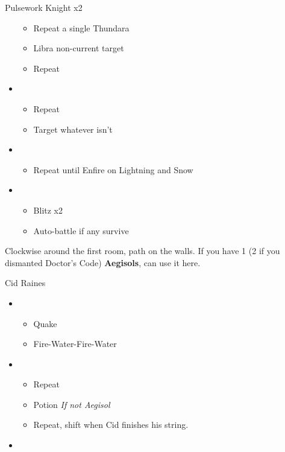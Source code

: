 \begin{paracol}{2}
\begin{battle}{Pulsework Knight x2}
\begin{itemize}
\begin{itemize}
				      \item Repeat a single Thundara
				      \item Libra non-current target
				      \item Repeat
			      \end{itemize}
			\item \fourth
			      \begin{itemize}
				      \item Repeat
				      \item Target whatever isn't \stagger
			      \end{itemize}
			\item \fifth
			      \begin{itemize}
				      \item Repeat until Enfire on Lightning and Snow
			      \end{itemize}
			\item \sixth
			      \begin{itemize}
				      \item Blitz x2
				      \item Auto-battle if any survive
			      \end{itemize}
		\end{itemize}
	\end{battle}
	\switchcolumn*
	Clockwise around the first room, path on the walls.
	If you have 1 (2 if you dismanted Doctor's Code) \textbf{Aegisols}, can use it here.
	\begin{battle}{Cid Raines}
		\begin{itemize}
			\item \first
			      \begin{itemize}
				      \item Quake
				      \item Fire-Water-Fire-Water
			      \end{itemize}
			\item \third
			      \begin{itemize}
				      \item Repeat
				      \item Potion \textit{If not Aegisol}
				      \item Repeat, shift when Cid finishes his string.
			      \end{itemize}
			\item \fifth
			      \begin{itemize}

\end{itemize}
\end{itemize}
\end{battle}
\end{paracol}
